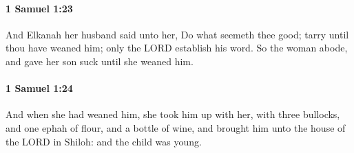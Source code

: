 		\paragraph{1 Samuel 1:23} %
			\label{1SAMUEL-1-23}

			And Elkanah her husband said unto her, Do what seemeth thee good; tarry until thou have weaned him; only the LORD establish his word. So the woman abode, and gave her son suck until she weaned him.


		\paragraph{1 Samuel 1:24} %
			\label{1SAMUEL-1-24}

			And when she had weaned him, she took him up with her, with three bullocks, and one ephah of flour, and a bottle of wine, and brought him unto the house of the LORD in Shiloh: and the child was young.


